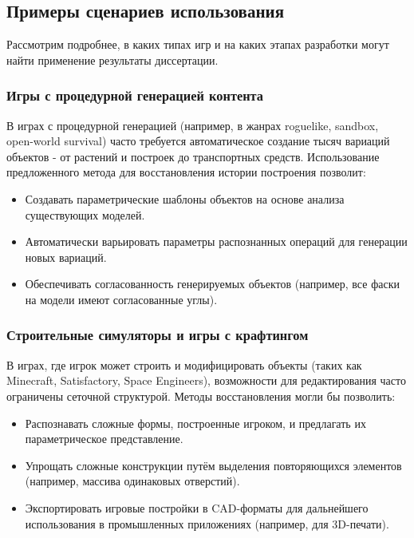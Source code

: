 \subsection{Примеры сценариев использования}

Рассмотрим подробнее, в каких типах игр и на каких этапах разработки могут найти применение результаты диссертации.

\subsubsection{Игры с процедурной генерацией контента}

В играх с процедурной генерацией (например, в жанрах roguelike, sandbox, open-world survival) часто требуется автоматическое создание тысяч вариаций объектов - от растений и построек до транспортных средств. Использование предложенного метода для восстановления истории построения позволит:
\begin{itemize}
    \item Создавать параметрические шаблоны объектов на основе анализа существующих моделей.
    \item Автоматически варьировать параметры распознанных операций для генерации новых вариаций.
    \item Обеспечивать согласованность генерируемых объектов (например, все фаски на модели имеют согласованные углы).
\end{itemize}

\subsubsection{Строительные симуляторы и игры с крафтингом}

В играх, где игрок может строить и модифицировать объекты (таких как Minecraft, Satisfactory, Space Engineers), возможности для редактирования часто ограничены сеточной структурой. Методы восстановления могли бы позволить:
\begin{itemize}
    \item Распознавать сложные формы, построенные игроком, и предлагать их параметрическое представление.
    \item Упрощать сложные конструкции путём выделения повторяющихся элементов (например, массива одинаковых отверстий).
    \item Экспортировать игровые постройки в CAD-форматы для дальнейшего использования в промышленных приложениях (например, для 3D-печати).
\end{itemize}

